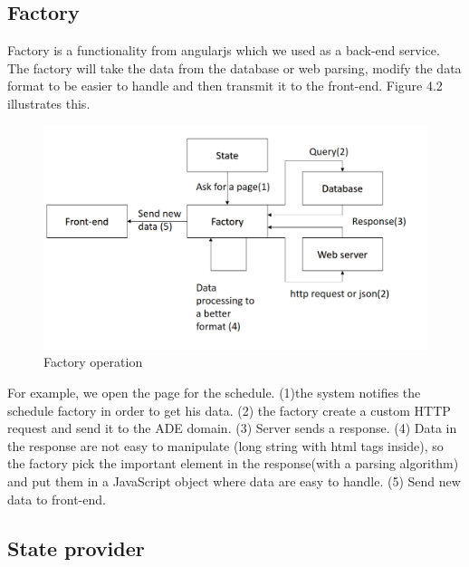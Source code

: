 \documentclass{eplmastersthesis}
\begin{document}
\subsection{Factory}

Factory is a functionality from angularjs which we used as a back-end service. The factory will take the data from the database or web parsing, modify the data format to be easier to handle and then transmit it to the front-end. Figure 4.2 illustrates this.\\

\begin{figure}
\centering
\includegraphics[scale = 0.3]{Images/factory_arch.png}
\caption{Factory operation}
\end{figure}

For example, we open the page for the schedule. (1)the system notifies the schedule factory in order to get his data. (2) the factory create a custom HTTP request and send it to the ADE domain. (3) Server sends a response. (4) Data in the response are not easy to manipulate (long string with html tags inside), so the factory pick the important element in the response(with a parsing algorithm) and put them in a JavaScript object where data are easy to handle. (5) Send new data to front-end.

\subsection{State provider}
\end{document}
